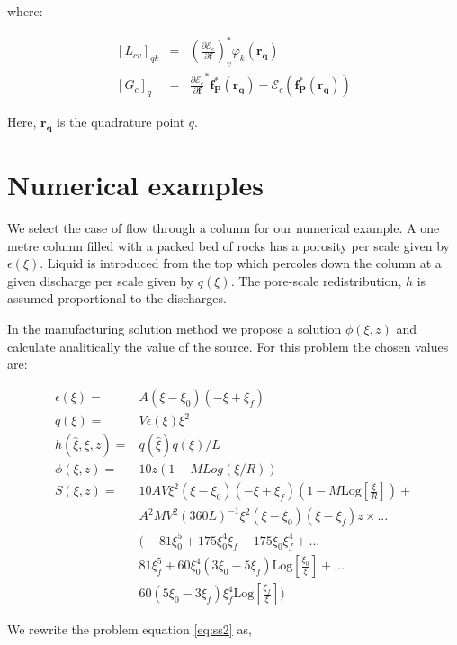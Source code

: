 \documentclass{CFD2011}
\begin{document}
\noindent where:

\begin{eqnarray}
\left[L_{cv}\right]_{qk}&=&\left(\frac{\partial \mathcal{E}_c}{\partial \mathbf{f}}\right)^*_v \varphi_k (\mathbf{r_q}) \nonumber \\
\left[G_{c}\right]_{q}&=&\frac{\partial \mathcal{E}_c}{\partial \mathbf{f}}^*\mathbf{f_P^*}(\mathbf{r_q})-\mathcal{E}_c(\mathbf{f_P^*}(\mathbf{r_q}))
\end{eqnarray}

Here, $\mathbf{r_q}$ is the quadrature point $q$.

\section{Numerical examples}


We select the case of flow through a column for our numerical example. A one metre column filled with a packed bed of rocks has a porosity per scale given by $\epsilon({\xi})$. Liquid is introduced from the top which percoles down the column at a given discharge per scale given by $q({\xi})$. The pore-scale redistribution, $h$  is assumed proportional to the discharges.

In the manufacturing solution method we propose a solution $\phi(\xi, z)$ and calculate analitically the value of the source. For this problem the chosen values are:

\begin{align}
\epsilon(\xi)=&A (\xi-\xi_0) (-\xi+\xi_f) \\
q({\xi}) =&V \epsilon(\xi) \xi^2\\
h(\hat \xi, \xi, z) =& q(\hat \xi) q(\xi)/L\\
\phi(\xi, z) =& 10 z (1-M Log({\xi}/R))\\
\nonumber S(\xi, z)=& 10 A V {\xi}^2 ({\xi}-\xi_0) (-{\xi}+\xi_f) \left(1-M \text{Log}\left[\frac{{\xi}}{R}\right]\right) +\\
\nonumber  &A^2 M V^2  (360 L)^{-1} {\xi}^2 ({\xi}-\xi_0) ({\xi}-\xi_f) z \times ... \\
\nonumber  &\big(-81 \xi_0^5+175 \xi_0^4 \xi_f-175 \xi_0 \xi_f^4+  ...\\
\nonumber &81 \xi_f^5+60 \xi_0^4 (3 \xi_0-5 \xi_f) \text{Log}\left[\frac{\xi_0}{{\xi}}\right]+ ...\\
& 60 (5 \xi_0-3 \xi_f) \xi_f^4 \text{Log}\left[\frac{\xi_f}{{\xi}}\right]\big)
\end{align}

We rewrite the problem equation \ref{eq:ss2} as,
\end{document}
